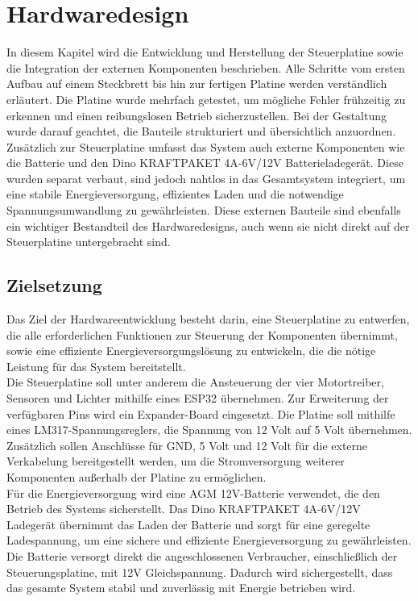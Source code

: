 \documentclass[ngerman,12pt,a4paper]{article}
\begin{document}
	\section{Hardwaredesign}

	In diesem Kapitel wird die Entwicklung und Herstellung der Steuerplatine sowie die Integration der externen Komponenten beschrieben. Alle Schritte vom ersten Aufbau auf einem Steckbrett bis hin zur fertigen Platine werden verständlich erläutert. Die Platine wurde mehrfach getestet, um mögliche Fehler frühzeitig zu erkennen und einen reibungslosen Betrieb sicherzustellen. Bei der Gestaltung wurde darauf geachtet, die Bauteile strukturiert und übersichtlich anzuordnen. \\[0.4cm]
	Zusätzlich zur Steuerplatine umfasst das System auch externe Komponenten wie die Batterie und den Dino KRAFTPAKET 4A-6V/12V Batterieladegerät. Diese wurden separat verbaut, sind jedoch nahtlos in das Gesamtsystem integriert, um eine stabile Energieversorgung, effizientes Laden und die notwendige Spannungsumwandlung zu gewährleisten. Diese externen Bauteile sind ebenfalls ein wichtiger Bestandteil des Hardwaredesigns, auch wenn sie nicht direkt auf der Steuerplatine untergebracht sind.
	
	
		\subsection{Zielsetzung} %
		
		Das Ziel der Hardwareentwicklung besteht darin, eine Steuerplatine zu entwerfen, die alle erforderlichen Funktionen zur Steuerung der Komponenten übernimmt, sowie eine effiziente Energieversorgungslösung zu entwickeln, die die nötige Leistung für das System bereitstellt.\\[0.4cm] 
		Die Steuerplatine soll unter anderem die Ansteuerung der vier Motortreiber, Sensoren und Lichter mithilfe eines ESP32 übernehmen. Zur Erweiterung der verfügbaren Pins wird ein Expander-Board eingesetzt. Die Platine soll mithilfe eines LM317-Spannungsreglers, die Spannung von 12 Volt auf 5 Volt übernehmen. Zusätzlich sollen Anschlüsse für GND, 5 Volt und 12 Volt für die externe Verkabelung bereitgestellt werden, um die Stromversorgung weiterer Komponenten außerhalb der Platine zu ermöglichen.\\[0.4cm]
		Für die Energieversorgung wird eine AGM 12V-Batterie verwendet, die den Betrieb des Systems sicherstellt. Das Dino KRAFTPAKET 4A-6V/12V Ladegerät übernimmt das Laden der Batterie und sorgt für eine geregelte Ladespannung, um eine sichere und effiziente Energieversorgung zu gewährleisten. Die Batterie versorgt direkt die angeschlossenen Verbraucher, einschließlich der Steuerungsplatine, mit 12V Gleichspannung. Dadurch wird sichergestellt, dass das gesamte System stabil und zuverlässig mit Energie betrieben wird.
		
\end{document}
